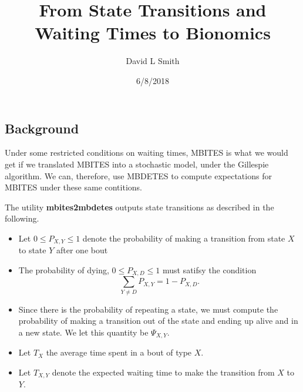 \documentclass[]{article}
\title{From State Transitions and Waiting Times to Bionomics}
\author{David L Smith}
\date{6/8/2018}
\providecommand{\tightlist}{%
  \setlength{\itemsep}{0pt}\setlength{\parskip}{0pt}}
\begin{document}
\maketitle

\subsection{Background}\label{background}

Under some restricted conditions on waiting times, MBITES is what we
would get if we translated MBITES into a stochastic model, under the
Gillespie algorithm. We can, therefore, use MBDETES to compute
expectations for MBITES under these same contitions.

The utility \textbf{mbites2mbdetes} outputs state transitions as
described in the following.

\begin{itemize}
\tightlist
\item
  Let \(0\leq P_{X,Y}\leq 1\) denote the probability of making a
  transition from state \(X\) to state \(Y\) after one bout
\item
  The probability of dying, \(0 \leq P_{X,D} \leq 1\) must satifsy the
  condition \[\sum_{Y\neq D}P_{X,Y} =1-P_{X,D}.\]
\item
  Since there is the probability of repeating a state, we must compute
  the probability of making a transition out of the state and ending up
  alive and in a new state. We let this quantity be \(\Psi_{X,Y}\).
\item
  Let \(T_{X}\) the average time spent in a bout of type \(X\).
\item
  Let \(T_{X,Y}\) denote the expected waiting time to make the
  transition from \(X\) to \(Y\).
\end{itemize}
\end{document}
